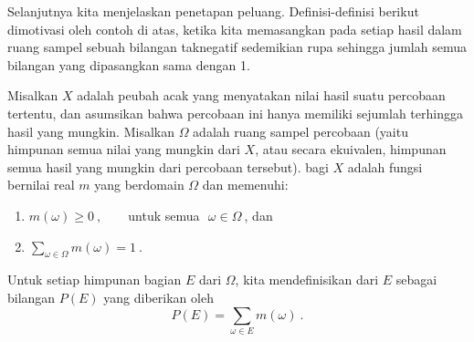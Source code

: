Selanjutnya kita menjelaskan penetapan peluang.  Definisi-definisi berikut
dimotivasi oleh contoh di atas, ketika kita memasangkan pada setiap hasil dalam
ruang sampel sebuah bilangan taknegatif sedemikian rupa sehingga jumlah semua bilangan yang dipasangkan
sama dengan 1.

\begin{definition}\label{def 1.2} 
Misalkan $X$ adalah peubah acak yang menyatakan nilai hasil suatu percobaan tertentu,
dan asumsikan bahwa percobaan ini hanya memiliki sejumlah terhingga hasil yang mungkin.  Misalkan $\Omega$ adalah
ruang sampel percobaan (yaitu himpunan semua nilai yang mungkin dari $X$, atau secara ekuivalen,
himpunan semua hasil yang mungkin dari percobaan tersebut).   bagi $X$ adalah fungsi bernilai
real $m$ yang berdomain $\Omega$ dan memenuhi:
\begin{enumerate}
\item $m(\omega) \geq 0\ , \qquad$untuk semua $\,\,\omega\in\Omega\ $, dan  
\medbreak
\item $\sum\limits_{\omega \in \Omega} m(\omega) = 1\ $.  
\end{enumerate}
Untuk setiap himpunan bagian $E$ dari $\Omega$, kita mendefinisikan 
dari
$E$ sebagai bilangan $P(E)$ yang diberikan oleh
$$
P(E) = \sum_{\omega\in E} m(\omega)\ .
$$
\end{definition}
 
